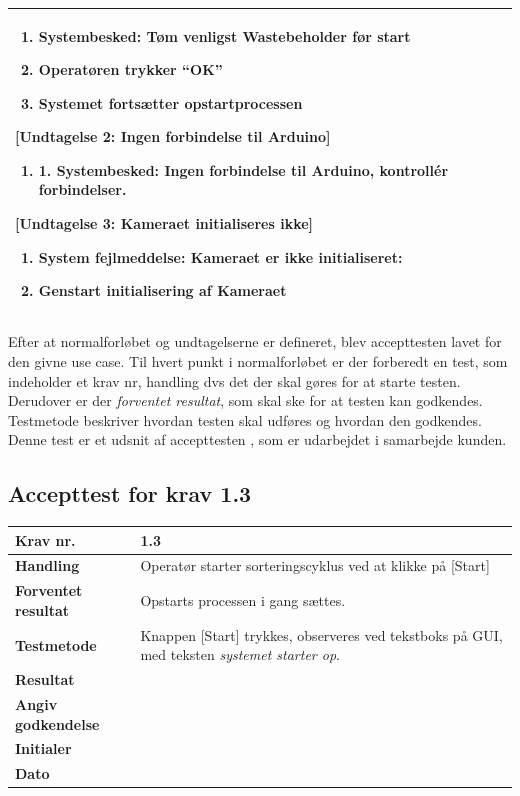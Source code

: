 \begin{center}
\begin{longtable}{ | m{4cm} | m{8cm}| }
			\begin{enumerate}
			\item Systembesked: Tøm venligst Wastebeholder før start
			\item Operatøren trykker “OK”
			\item Systemet fortsætter opstartprocessen
			\end{enumerate} 
			
			[Undtagelse 2: Ingen forbindelse til Arduino]
			
			\begin{enumerate}
			\item 1.	Systembesked: Ingen forbindelse til Arduino, kontrollér forbindelser.
			\end{enumerate} 
	
			[Undtagelse 3: Kameraet initialiseres ikke]
			
			\begin{enumerate}
			\item System fejlmeddelse: Kameraet er ikke initialiseret:
			\item Genstart initialisering af Kameraet
			\end{enumerate} \\
			\hline
		\end{longtable}
		
	\end{center}

Efter at normalforløbet og undtagelserne er defineret, blev accepttesten lavet for den givne use case. Til hvert punkt i normalforløbet er der forberedt en test, som indeholder et krav nr, handling dvs det der skal gøres for at starte testen. Derudover er der \textit{forventet resultat}, som skal ske for at testen kan godkendes. Testmetode beskriver hvordan testen skal udføres og hvordan den godkendes. Denne test er et udsnit af accepttesten , som er udarbejdet i samarbejde kunden.

\subsection{Accepttest for krav 1.3}
	\begin{center}
		\begin{longtable}{ | m{4cm}| m{8.5cm}|} 
			\hline
			\textbf{Krav nr.} & 1.3    \\ 
			\hline
			\textbf{Handling} &  Operatør starter sorteringscyklus ved at klikke på [Start]  \\
			\hline
			\textbf{Forventet resultat} &  Opstarts processen i gang sættes.  \\
			\hline
			\textbf{Testmetode}  & Knappen [Start] trykkes, observeres ved tekstboks på GUI, med teksten \textit{systemet starter op}.   \\
			\hline
			\textbf{Resultat}  &    \\
			\hline
			\textbf{Angiv godkendelse} &     \\
			\hline
			\textbf{Initialer} &     \\
			\hline
			\textbf{Dato} &    \\
			\hline
		\end{longtable}
	\end{center}
	
